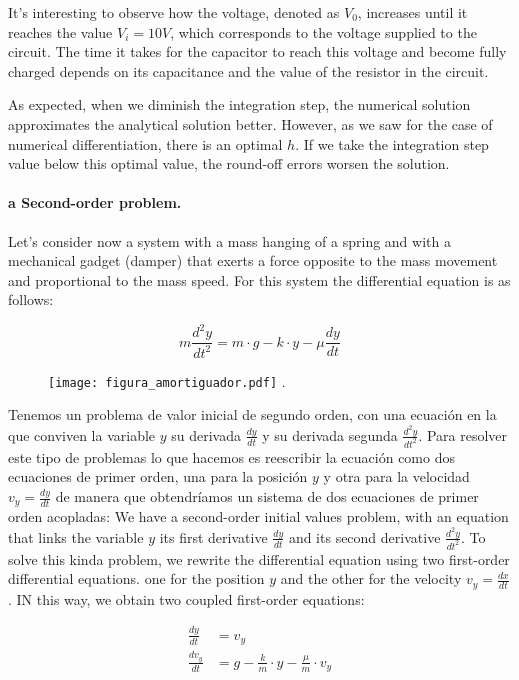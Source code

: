 \begin{paracol}{2}
It's interesting to observe how the voltage, denoted as $V_0$, increases until it reaches the value $V_i = 10V$, which corresponds to the voltage supplied to the circuit. The time it takes for the capacitor to reach this voltage and become fully charged depends on its capacitance and the value of the resistor in the circuit.

As expected, when we diminish the integration step, the numerical solution approximates the analytical solution better. However, as we saw for the case of numerical differentiation, there is an optimal $h$. If we take the integration step value below this optimal value, the round-off errors worsen the solution.

\paragraph{a Second-order problem.} Let's consider now a system with a mass hanging of a spring and with a mechanical gadget (damper) that exerts a force  opposite to the mass movement and proportional to the mass speed. For this system the differential equation is as follows:

\end{paracol}

\begin{equation*}
m\frac{d^2 y}{dt^2}=m\cdot g-k \cdot y-\mu \frac{dy}{dt}
\end{equation*}

\begin{figure}[h]
	\centering
	\texttt{[image: figura\_amortiguador.pdf]}
	.
	\label{fig:masa_suspendida}
\end{figure}

\begin{paracol}{2}
Tenemos un problema de valor inicial de segundo orden, con una ecuación en la que conviven la variable $y$ su derivada $\frac{dy}{dt}$ y su derivada segunda $\frac{d^2y}{dt^2}$. Para resolver este tipo de problemas lo que hacemos es reescribir la ecuación como dos ecuaciones de primer orden, una para la posición $y$ y otra para la velocidad $v_y=\frac{dy}{dt}$ de manera que obtendríamos un sistema de dos ecuaciones de primer orden acopladas:
\switchcolumn
We have a second-order initial values problem, with an equation that links the variable $y$ its first derivative $\frac{dy}{dt}$ and its second derivative $\frac{d^2y}{dt^2}$. To solve this kinda problem, we rewrite the differential equation using  two first-order differential equations. one for the position $y$ and the other for the velocity $v_y = \frac{dx}{dt}$. IN this way, we obtain two coupled first-order equations:    
\end{paracol}
\begin{align*}
\frac{dy}{dt}&=v_y \\
\frac{dv_y}{dt}&=g-\frac{k}{m}\cdot y - \frac{\mu}{m}\cdot v_y 
\end{align*}

